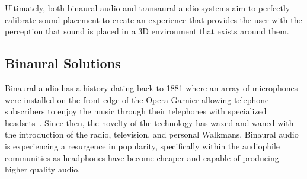 Ultimately, both binaural audio and transaural audio systems aim to perfectly
calibrate sound placement to create an experience that provides the user with
the perception that sound is placed in a 3D environment that exists around them.



\subsection{                 Binaural Solutions                               }

Binaural audio has a history dating back to 1881 where an array of microphones
were installed on the front edge of the Opera Garnier allowing telephone
subscribers to enjoy the music through their telephones with specialized
headsets~\cite{jost2000transaural}. Since then, the novelty of the technology
has waxed and waned with the introduction of the radio, television, and personal
Walkmans. Binaural audio is experiencing a resurgence in popularity,
specifically within the audiophile communities as headphones have become
cheaper and capable of producing higher quality audio.


